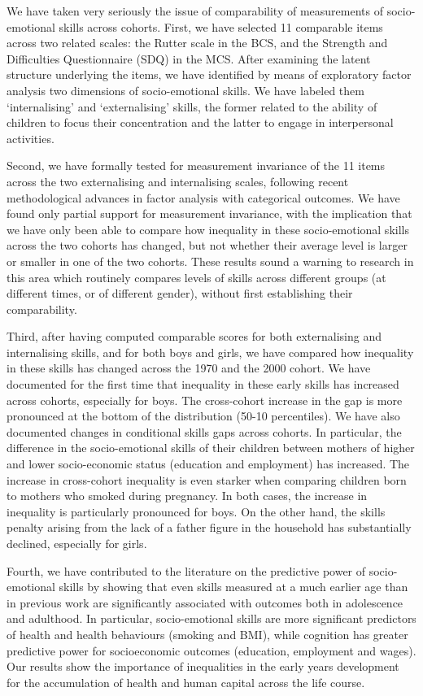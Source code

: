 We have taken very seriously the issue of comparability of measurements of socio-emotional skills across cohorts. First, we have selected 11 comparable items across two related scales: the Rutter scale in the BCS, and the Strength and Difficulties Questionnaire (SDQ) in the MCS. After examining the latent structure underlying the items, we have identified by means of exploratory factor analysis two dimensions of socio-emotional skills. We have labeled them `internalising' and `externalising' skills, the former related to the ability of children to focus their concentration and the latter to engage in interpersonal activities.

Second, we have formally tested for measurement invariance of the 11 items across the two externalising and internalising scales, following recent methodological advances in factor analysis with categorical outcomes. We have found only partial support for measurement invariance, with the implication that we have only been able to compare how inequality in these socio-emotional skills across the two cohorts has changed, but not whether their average level is larger or smaller in one of the two cohorts. These results sound a warning to research in this area which routinely compares levels of skills across different groups (at different times, or of different gender), without first establishing their comparability.

Third, after having computed comparable scores for both externalising and internalising skills, and for both boys and girls, we have compared how inequality in these skills has changed across the 1970 and the 2000 cohort. We have documented for the first time that inequality in these early skills has increased across cohorts, especially for boys. The cross-cohort increase in the gap is more pronounced at the bottom of the distribution (50-10 percentiles). We have also documented changes in conditional skills gaps across cohorts. In particular, the difference in the socio-emotional skills of their children between mothers of higher and lower socio-economic status (education and employment) has increased. The increase in cross-cohort inequality is even starker when comparing children born to mothers who smoked during pregnancy. In both cases, the increase in inequality is particularly pronounced for boys. On the other hand, the skills penalty arising from the lack of a father figure in the household has substantially declined, especially for girls.

Fourth, we have contributed to the literature on the predictive power of socio-emotional skills by showing that even skills measured at a much earlier age than in previous work are significantly associated with outcomes both in adolescence and adulthood. In particular, socio-emotional skills are more significant predictors of health and health behaviours (smoking and BMI), while cognition has greater predictive power for socioeconomic outcomes (education, employment and wages). Our results show the importance of inequalities in the early years development for the accumulation of health and human capital across the life course. 
